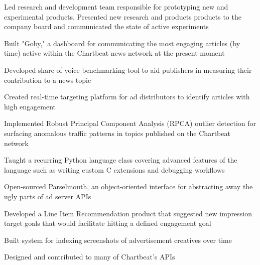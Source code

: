 \documentclass[]{deedy-resume-openfont}
\begin{document}
    \begin{tightemize}
        \item
            Led research and development team responsible for prototyping new
            and experimental products. Presented new research and products
            products to the company board and communicated the state of active
            experiments
        \item
            Built "Goby," a dashboard for communicating the most engaging
            articles (by time) active within the Chartbeat news network at the
            present moment
        \item
            Developed share of voice benchmarking tool to aid publishers in
            measuring their contribution to a news topic
        \item
            Created real-time targeting platform for ad distributors to
            identify articles with high engagement
        \item
            Implemented Robust Principal Component Analysis (RPCA) outlier
            detection for surfacing anomalous traffic patterns in topics
            published on the Chartbeat network
        \item
            Taught a recurring Python language class covering advanced features
            of the language such as writing custom C extensions and debugging
            workflows
    \end{tightemize}
    \vspace{5pt}

    \begin{tightemize}
        \item
            Open-sourced Parselmouth, an object-oriented interface for
            abstracting away the ugly parts of ad server APIs
        \item
            Developed a Line Item Recommendation product that suggested new
            impression target goals that would facilitate hitting a defined
            engagement goal
        \item
            Built system for indexing screenshots of advertisement creatives
            over time
        \item
            Designed and contributed to many of Chartbeat's APIs
    \end{tightemize}
\sectionsep
\end{document}
